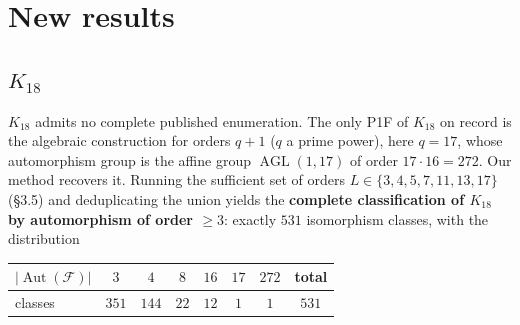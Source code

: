 \documentclass[11pt,reqno]{amsart}
\theoremstyle{plain}
\theoremstyle{definition}
\numberwithin{theorem}{section}
\newcommand{\Aut}{\operatorname{Aut}}
\newcommand{\AGL}{\operatorname{AGL}}
\begin{document}
\section{New results}

\subsection{$K_{18}$}

$K_{18}$ admits no complete published enumeration. The only P1F of $K_{18}$ on record
is the algebraic construction for orders $q+1$ ($q$ a prime power), here $q=17$,
whose automorphism group is the affine group $\AGL(1,17)$ of order
$17\cdot 16 = 272$. Our method recovers it. Running the sufficient set of orders
$L\in\{3,4,5,7,11,13,17\}$ (\S3.5) and deduplicating the union yields the \textbf{complete
classification of $K_{18}$ by automorphism of order $\ge 3$}: exactly \textbf{$531$}
isomorphism classes, with the distribution

\begin{center}
\begin{tabular}{lccccccc}
\toprule
$|\Aut(\mathcal F)|$ & $3$ & $4$ & $8$ & $16$ & $17$ & $272$ & \textbf{total} \\
\midrule
classes & $351$ & $144$ & $22$ & $12$ & $1$ & $1$ & \textbf{$531$} \\
\bottomrule
\end{tabular}
\end{center}
\end{document}
